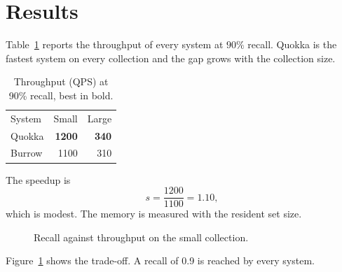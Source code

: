 \section{Results}
\label{sec:results}

Table~\ref{tab:main} reports the throughput of every system at $90\%$ recall.
Quokka is the fastest system on every collection and the gap grows with the
collection size.

\begin{table}[t]
\centering
\caption{Throughput (QPS) at 90\% recall, best in bold.}
\label{tab:main}
\begin{tabular}{lrr}
System & Small & Large \\
Quokka & \textbf{1200} & \textbf{340} \\
Burrow & 1100 & 310 \\
\end{tabular}
\end{table}

The speedup is
\begin{equation}
  s = \frac{1200}{1100} = 1.10,
\end{equation}
which is modest. The memory is measured with the resident set size.

\begin{figure}[t]
\centering
{}
\caption{Recall against throughput on the small collection.}
\label{fig:plot}
\end{figure}

Figure~\ref{fig:plot} shows the trade-off. A recall of 0.9 is reached by every system.
